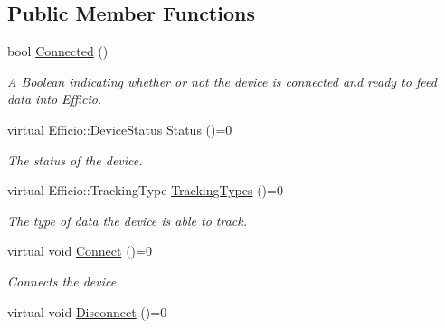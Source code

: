 \subsection*{Public Member Functions}
\begin{DoxyCompactItemize}
\item 
bool \hyperlink{class_efficio_1_1_sensor_a465f078de308632e64c8c44781462bc8}{Connected} ()\hypertarget{class_efficio_1_1_sensor_a465f078de308632e64c8c44781462bc8}{}\label{class_efficio_1_1_sensor_a465f078de308632e64c8c44781462bc8}

\begin{DoxyCompactList}\small\item\em A Boolean indicating whether or not the device is connected and ready to feed data into Efficio. \end{DoxyCompactList}\item 
virtual Efficio\+::\+Device\+Status \hyperlink{class_efficio_1_1_sensor_a32fe6e05b79f0ed8243b2c76fbde43bc}{Status} ()=0\hypertarget{class_efficio_1_1_sensor_a32fe6e05b79f0ed8243b2c76fbde43bc}{}\label{class_efficio_1_1_sensor_a32fe6e05b79f0ed8243b2c76fbde43bc}

\begin{DoxyCompactList}\small\item\em The status of the device. \end{DoxyCompactList}\item 
virtual Efficio\+::\+Tracking\+Type \hyperlink{class_efficio_1_1_sensor_af1cc5602ed8481c80a1376e1d625b0d6}{Tracking\+Types} ()=0\hypertarget{class_efficio_1_1_sensor_af1cc5602ed8481c80a1376e1d625b0d6}{}\label{class_efficio_1_1_sensor_af1cc5602ed8481c80a1376e1d625b0d6}

\begin{DoxyCompactList}\small\item\em The type of data the device is able to track. \end{DoxyCompactList}\item 
virtual void \hyperlink{class_efficio_1_1_sensor_afb697236bac03d10d5e3b3c686d4fa37}{Connect} ()=0\hypertarget{class_efficio_1_1_sensor_afb697236bac03d10d5e3b3c686d4fa37}{}\label{class_efficio_1_1_sensor_afb697236bac03d10d5e3b3c686d4fa37}

\begin{DoxyCompactList}\small\item\em Connects the device. \end{DoxyCompactList}\item 
virtual void \hyperlink{class_efficio_1_1_sensor_ae8ed640486cb581128cabdee99b082a1}{Disconnect} ()=0\hypertarget{class_efficio_1_1_sensor_ae8ed640486cb581128cabdee99b082a1}{}\label{class_efficio_1_1_sensor_ae8ed640486cb581128cabdee99b082a1}


\end{DoxyCompactItemize}
